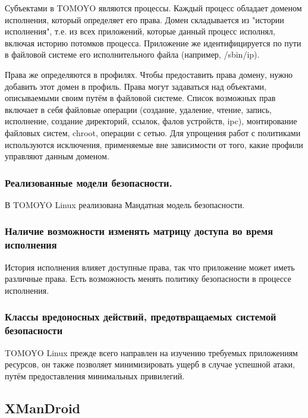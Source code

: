 Субъектами в TOMOYO являются процессы. Каждый процесс обладает доменом
исполнения, который определяет его права. Домен складывается из "истории
исполнения", т.е. из всех приложений, которые данный процесс исполнял,
включая историю потомков процесса. Приложение же идентифицируется по
пути в файловой системе его исполнительного файла (например, /sbin/ip).

Права же определяются в профилях. Чтобы предоставить права домену, нужно
добавить этот домен в профиль. Права могут задаваться над объектами,
описываемыми своим путём в файловой системе. Список возможных прав
включает в себя файловые операции (создание, удаление, чтение, запись,
исполнение, создание директорий, ссылок, фалов устройств, ipc),
монтирование файловых систем, chroot, операции с сетью. Для упрощения
работ с политиками используются исключения, применяемые вне зависимости
от того, какие профили управляют данным доменом.

\subsubsection {Реализованные модели безопасности.} 

В TOMOYO Linux реализована Мандатная модель безопасности.

\subsubsection{Наличие возможности изменять матрицу доступа 
	во время исполнения} 

История исполнения влияет доступные права, так что приложение может
иметь различные права. Есть возможность менять политику безопасности в
процессе исполнения.

\subsubsection{Классы вредоносных действий, предотвращаемых 
	системой безопасности} 

TOMOYO Linux прежде всего направлен на изучению требуемых приложениям
ресурсов, он также позволяет минимизировать ущерб в случае успешной
атаки, путём предоставления минимальных привилегий.


\bigskip
\subsection{XManDroid} 


